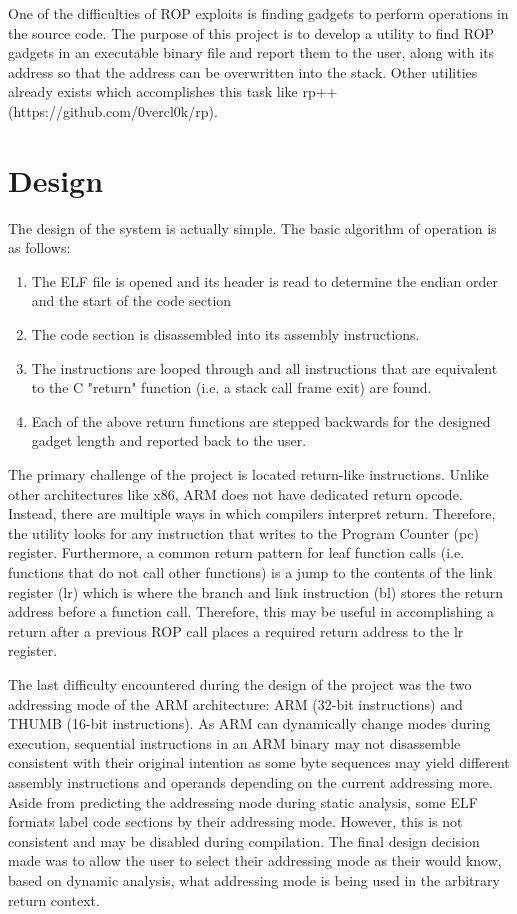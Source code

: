 \documentclass{article}
\begin{document}
\begin{multicols}{2}
    \par One of the difficulties of ROP exploits is finding gadgets to perform operations in the source code. The purpose of this project is to develop a utility to find ROP gadgets in an executable binary file and report them to the user, along with its address so that the address can be overwritten into the stack. Other utilities already exists which accomplishes this task like rp++ (https://github.com/0vercl0k/rp).

    \section{Design}
    \par The design of the system is actually simple. The basic algorithm of operation is as follows:
    \begin{enumerate}
        \item The ELF file is opened and its header is read to determine the endian order and the start of the code section
        \item The code section is disassembled into its assembly instructions.
        \item The instructions are looped through and all instructions that are equivalent to the C "return" function (i.e. a stack call frame exit) are found.
        \item Each of the above return functions are stepped backwards for the designed gadget length and reported back to the user.
    \end{enumerate}
    \par The primary challenge of the project is located return-like instructions. Unlike other architectures like x86, ARM does not have dedicated return opcode. Instead, there are multiple ways in which compilers interpret return. Therefore, the utility looks for any instruction that writes to the Program Counter (pc) register. Furthermore, a common return pattern for leaf function calls (i.e. functions that do not call other functions) is a jump to the contents of the link register (lr) which is where the branch and link instruction (bl) stores the return address before a function call. Therefore, this may be useful in accomplishing a return after a previous ROP call places a required return address to the lr register.
    \par The last difficulty encountered during the design of the project was the two addressing mode of the ARM architecture: ARM (32-bit instructions) and THUMB (16-bit instructions). As ARM can dynamically change modes during execution, sequential instructions in an ARM binary may not disassemble consistent with their original intention as some byte sequences may yield different assembly instructions and operands depending on the current addressing more. Aside from predicting the addressing mode during static analysis, some ELF formats label code sections by their addressing mode. However, this is not consistent and may be disabled during compilation. The final design decision made was to allow the user to select their addressing mode as their would know, based on dynamic analysis, what addressing mode is being used in the arbitrary return context.


\end{multicols}
\end{document}
